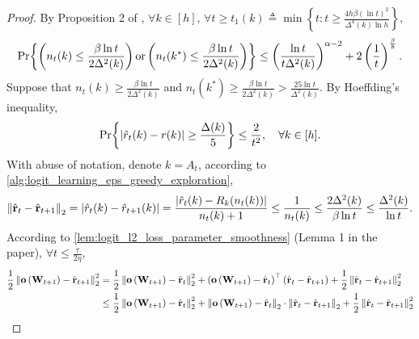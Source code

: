 \begin{proof}
	By Proposition 2 of \citep{seldin2017improved},
	$\forall k \in [h]$, $\forall t \ge t_1(k) \triangleq \min{\left\{ t : t \ge \frac{4 h \beta \left(\ln{t}\right)^2}{\Delta^4(k) \ln{h}} \right\}}$,
	\begin{equation*}
	\begin{split}
	{\text{Pr}}{\left\{ \left( n_t(k) \le \frac{\beta \ln{t}}{2 \Delta^2(k)} \right) \text{or} \left( n_t(k^*) \le \frac{\beta \ln{t}}{2 \Delta^2(k)} \right) \right\}} \le \left( \frac{\ln{t}}{t \Delta^2(k)} \right)^{\alpha - 2} + 2 \left(\frac{1}{t}\right)^{\frac{\beta}{8}}.
	\end{split}
	\end{equation*}
	Suppose that $n_t(k) \ge \frac{\beta \ln{t}}{2 \Delta^2(k)}$ and $n_t(k^*) \ge \frac{\beta \ln{t}}{2 \Delta^2(k)} > \frac{25 \ln{t}}{\Delta^2(k)}$. By Hoeffding's inequality,
	\begin{equation*}
	    {\text{Pr}}{\left\{ \left| \hat{r}_t(k) - r(k) \right| \ge \frac{\Delta(k)}{5} \right\}} \le \frac{2}{t^2}, \quad \forall k \in [h].
	\end{equation*}
	With abuse of notation, denote $k = A_t$, according to \cref{alg:logit_learning_eps_greedy_exploration},
	\begin{equation*}
	\begin{split}
	    \left\| \hat{{\mathbf{r}}}_t - \hat{{\mathbf{r}}}_{t+1} \right\|_2 = \left| \hat{r}_t(k) - \hat{r}_{t+1}(k) \right| = \frac{\left| \hat{r}_t(k) - R_k(n_t(k)) \right|}{n_t(k) + 1} \le \frac{1}{n_t(k)} \le \frac{2 \Delta^2(k)}{\beta \ln{t}} \le \frac{\Delta^2(k)}{\ln{t}}.
	\end{split}
	\end{equation*}
	According to \cref{lem:logit_l2_loss_parameter_smoothness} (Lemma 1 in the paper), $\forall t \le \frac{\tau}{2 \eta}$,
	\begin{equation*}
	\begin{split}
	\frac{1}{2} \left\| \rvo\left( \rmW_{t+1} \right) - \hat{\rvr}_{t+1}\right\|_2^2 &= \frac{1}{2} \left\| \rvo\left( \rmW_{t+1} \right) - \hat{\rvr}_t\right\|_2^2 + \left( \rvo\left( \rmW_{t+1} \right) - \hat{\rvr}_t \right)^\top \left( \hat{\rvr}_t - \hat{\rvr}_{t+1} \right) + \frac{1}{2} \left\| \hat{\rvr}_t - \hat{\rvr}_{t+1} \right\|_2^2 \\
	&\le \frac{1}{2} \left\| \rvo\left( \rmW_{t+1} \right) - \hat{\rvr}_t\right\|_2^2 + \left\| \rvo\left( \rmW_{t+1} \right) - \hat{\rvr}_t \right\|_2 \cdot \left\| \hat{\rvr}_t - \hat{\rvr}_{t+1} \right\|_2 + \frac{1}{2} \left\| \hat{\rvr}_t - \hat{\rvr}_{t+1} \right\|_2^2 \\

\end{split}
\end{equation*}
\end{proof}
